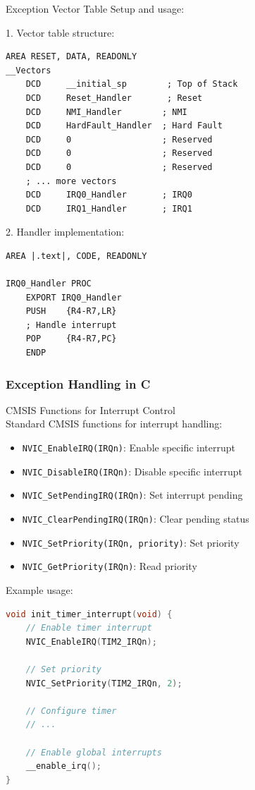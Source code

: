 \begin{KR}{Exception Vector Table}
Setup and usage:

1. Vector table structure:
\begin{lstlisting}[language=armasm, style=basesmol]
    AREA RESET, DATA, READONLY
__Vectors
    DCD     __initial_sp        ; Top of Stack
    DCD     Reset_Handler       ; Reset
    DCD     NMI_Handler        ; NMI
    DCD     HardFault_Handler  ; Hard Fault
    DCD     0                  ; Reserved
    DCD     0                  ; Reserved
    DCD     0                  ; Reserved
    ; ... more vectors
    DCD     IRQ0_Handler       ; IRQ0
    DCD     IRQ1_Handler       ; IRQ1
\end{lstlisting}

2. Handler implementation:
\begin{lstlisting}[language=armasm, style=basesmol]
    AREA |.text|, CODE, READONLY
    
IRQ0_Handler PROC
    EXPORT IRQ0_Handler
    PUSH    {R4-R7,LR}
    ; Handle interrupt
    POP     {R4-R7,PC}
    ENDP
\end{lstlisting}
\end{KR}


\subsubsection{Exception Handling in C}

\begin{KR}{CMSIS Functions for Interrupt Control}\\
Standard CMSIS functions for interrupt handling:
\begin{itemize}
  \item \texttt{NVIC\_EnableIRQ(IRQn)}: Enable specific interrupt
  \item \texttt{NVIC\_DisableIRQ(IRQn)}: Disable specific interrupt
  \item \texttt{NVIC\_SetPendingIRQ(IRQn)}: Set interrupt pending
  \item \texttt{NVIC\_ClearPendingIRQ(IRQn)}: Clear pending status
  \item \texttt{NVIC\_SetPriority(IRQn, priority)}: Set priority
  \item \texttt{NVIC\_GetPriority(IRQn)}: Read priority
\end{itemize}

Example usage:
\begin{lstlisting}[language=C, style=basesmol]
void init_timer_interrupt(void) {
    // Enable timer interrupt
    NVIC_EnableIRQ(TIM2_IRQn);
    
    // Set priority
    NVIC_SetPriority(TIM2_IRQn, 2);
    
    // Configure timer
    // ...
    
    // Enable global interrupts
    __enable_irq();
}
\end{lstlisting}
\end{KR}

